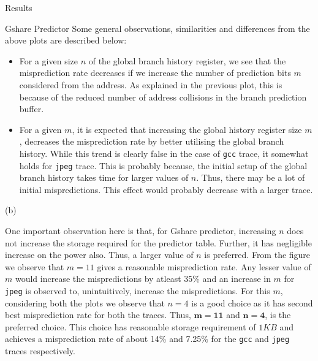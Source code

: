 \begin{section}{Results}
\begin{subsection}{Gshare Predictor}
        Some general observations, similarities and differences from the above plots are described below:
        \begin{itemize}
            \item For a given size $n$ of the global branch history register, we see that the misprediction rate decreases if we increase the number of prediction bits $m$ considered from the address. As explained in the previous plot, this is because of the reduced number of address collisions in the branch prediction buffer.
            \item For a given $m$, it is expected that increasing the global history register size $m$, decreases the misprediction rate by better utilising the global branch history. While this trend is clearly false in the case of \texttt{gcc} trace, it somewhat holds for \texttt{jpeg} trace. This is probably because, the initial setup of the global branch history takes time for larger values of $n$. Thus, there may be a lot of initial mispredictions. This effect would probably decrease with a larger trace.
        \end{itemize}


        \begin{center}
            (b)
        \end{center}
        One important observation here is that, for Gshare predictor, increasing $n$ does not increase the storage required for the predictor table. Further, it has negligible increase on the power also. Thus, a larger value of $n$ is preferred. From the figure we observe that $m=11$ gives a reasonable misprediction rate. Any lesser value of $m$ would increase the mispredictions by atleast 35\% and an increase in $m$ for \texttt{jpeg} is observed to, unintuitively, increase the mispredictions. For this $m$, considering both the plots we observe that $n=4$ is a good choice as it has second best misprediction rate for both the traces. Thus, $\mathbf{m=11}$ and $\mathbf{n=4}$, is the preferred choice. This choice has reasonable storage requirement of $1KB$ and achieves a misprediction rate of about 14\% and 7.25\% for the \texttt{gcc} and \texttt{jpeg} traces respectively.

    \end{subsection}

\end{section}